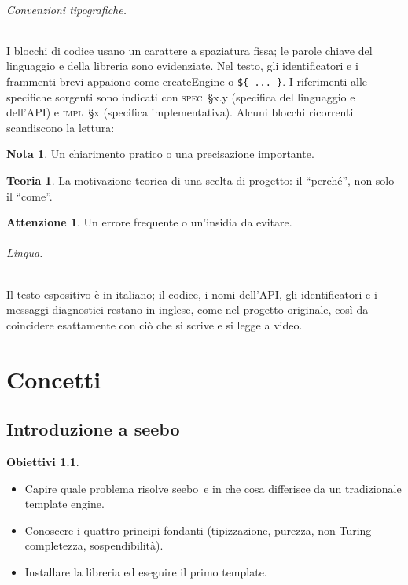 \documentclass[11pt,a4paper]{book}
\let\code\lstinline
\newcommand{\ic}[1]{{\ttfamily #1}}
\theoremstyle{definition}
\newtheorem*{obiettivi}{Obiettivi}
\newtheorem*{nota}{Nota}
\newtheorem*{teoria}{Teoria}
\newtheorem*{attenzione}{Attenzione}
\newcommand{\seebo}{\textsf{seebo}}
\newcommand{\spec}[1]{\textsc{spec}~\S#1}
\newcommand{\impl}[1]{\textsc{impl}~\S#1}
\begin{document}
\paragraph{Convenzioni tipografiche.} I blocchi di codice usano un carattere a
spaziatura fissa; le parole chiave del linguaggio e della libreria sono
evidenziate. Nel testo, gli identificatori e i frammenti brevi appaiono come
\ic{createEngine} o \code|${ ... }|. I riferimenti alle specifiche sorgenti
sono indicati con \spec{x.y} (specifica del linguaggio e dell'API) e
\impl{x} (specifica implementativa). Alcuni blocchi ricorrenti scandiscono la
lettura:

\begin{nota}
Un chiarimento pratico o una precisazione importante.
\end{nota}
\begin{teoria}
La motivazione teorica di una scelta di progetto: il ``perché'', non solo il
``come''.
\end{teoria}
\begin{attenzione}
Un errore frequente o un'insidia da evitare.
\end{attenzione}
\paragraph{Lingua.} Il testo espositivo è in italiano; il codice, i nomi
dell'API, gli identificatori e i messaggi diagnostici restano in inglese, come
nel progetto originale, così da coincidere esattamente con ciò che si scrive e
si legge a video.

\tableofcontents

\mainmatter

\part{Concetti}

\chapter{Introduzione a seebo}

\begin{obiettivi}
\begin{itemize}
  \item Capire quale problema risolve \seebo\ e in che cosa differisce da un
    tradizionale template engine.
  \item Conoscere i quattro principi fondanti (tipizzazione, purezza,
    non-Turing-completezza, sospendibilità).
  \item Installare la libreria ed eseguire il primo template.
\end{itemize}
\end{obiettivi}
\end{document}
